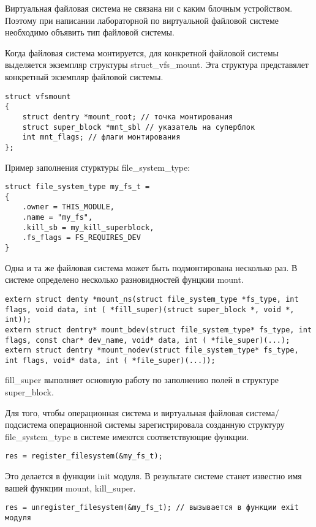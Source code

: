 Виртуальная файловая система не связана ни с каким блочным устройством. Поэтому при написании лабораторной по виртуальной файловой системе необходимо объявить тип файловой системы.

Когда файловая система монтируется, для конкретной файловой системы выделяется экземпляр структуры struct\_vfs\_mount. Эта структура представялет конкретный экземпляр файловой системы.

\begin{lstlisting}
struct vfsmount
{
	struct dentry *mount_root; // точка монтирования
	struct super_block *mnt_sbl // указатель на суперблок
	int mnt_flags; // флаги монтирования
};
\end{lstlisting}

Пример заполнения стурктуры file\_system\_type:\\
\begin{lstlisting}
struct file_system_type my_fs_t = 
{
	.owner = THIS_MODULE,
	.name = "my_fs",
	.kill_sb = my_kill_superblock,
	.fs_flags = FS_REQUIRES_DEV
}
\end{lstlisting}

Одна и та же файловая система может быть подмонтирована несколько раз. В системе определено несколько разновидностей фунцкии mount.

\begin{lstlisting}
extern struct denty *mount_ns(struct file_system_type *fs_type, int flags, void data, int ( *fill_super)(struct super_block *, void *, int));
extern struct dentry* mount_bdev(struct file_system_type* fs_type, int flags, const char* dev_name, void* data, int ( *file_super)(...);
extern struct dentry *mount_nodev(struct file_system_type* fs_type, int flags, void* data, int ( *file_super)(...));
\end{lstlisting}

fill\_super выполняет основную работу по заполнению полей в структуре super\_block.

Для того, чтобы операционная система и виртуальная файловая система/подсистема операционной системы зарегистрировала созданную структуру file\_system\_type в системе имеются соответствующие функции.
\begin{lstlisting}
res = register_filesystem(&my_fs_t);
\end{lstlisting}

Это делается в функции init модуля. В результате системе станет известно имя вашей функции mount, kill\_super.
\begin{lstlisting}
res = unregister_filesystem(&my_fs_t); // вызывается в функции exit модуля
\end{lstlisting}

